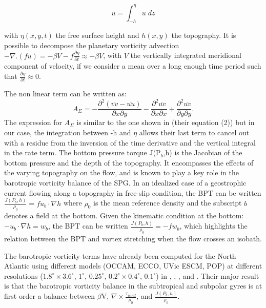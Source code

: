 \documentclass{ametsoc}
\begin{document}
$$\overline{u}=\int^{\eta}_{-h} u \; dz$$

with $\eta(x,y,t)$ the free surface height and $h(x,y)$ the topography. It is possible to decompose the planetary vorticity advection $-\nabla.(f\overline{u})=-\beta V-f \frac{\partial \eta}{\partial t}\approx - \beta V$, with $V$ the vertically integrated meridional component of velocity, if we consider a mean over a long enough time period such that $\frac{\partial \eta}{\partial t} \approx 0$.

The non linear term can be written as:
%
$$A_{\Sigma}= -\frac{\partial ^2 (\overline{vv}-\overline{uu})}{\partial x \partial y}-\frac{\partial ^2 \overline{uv}}{\partial x \partial x} +\frac{\partial ^2 \overline{uv}}{\partial y \partial y}.$$
%
The expression for $A_{\Sigma}$ is similar to the one shown in \citet{schoonover2016} (their equation (2)) but in our case, the integration between -h and $\eta$ allows their last term to cancel out with a residue from the inversion of the time derivative and the vertical integral in the rate term. The bottom pressure torque J(P$_b$,h) is the Jacobian of the bottom pressure and the depth of the topography. It encompasses the effects of the varying topography on the flow, and is known to play a key role in the barotropic vorticity balance of the SPG. In an idealized case of a geostrophic current flowing along a topography in free-slip condition, the BPT can be written $\frac{J(P_b,h)}{\rho _0}=f u_b \cdot \nabla h$ where $\rho_0$ is the mean reference density and the subscript $b$ denotes a field at the bottom. Given the kinematic condition at the bottom: $-u_b \cdot \nabla h =w_b$, the BPT can be written $\frac{J(P_b,h)}{\rho _0}=-fw_b$, which highlights the relation between the BPT and vortex stretching when the flow crosses an isobath.

The barotropic vorticity terms have already been computed for the North Atlantic using different models (OCCAM, ECCO, UVic ESCM, POP) at different resolutions ($1.8^{\circ}\times3.6^{\circ}$, $1^{\circ}$, $0.25^{\circ}$, $0.2^{\circ}\times 0.4^{\circ}$, $0.1^{\circ}$) in \citet{hughes2001}, \citet{spence2012}, \citet{sonnewald2019}, and \citet{yeager2015}. Their major result is that the barotropic vorticity balance in the subtropical and subpolar gyres is at first order a balance between $\beta$V, $\nabla \times \frac{\tau _{wind}}{\rho_{0}}$, and $\frac{J(P_b,h)}{\rho _0}$. 
\end{document}
